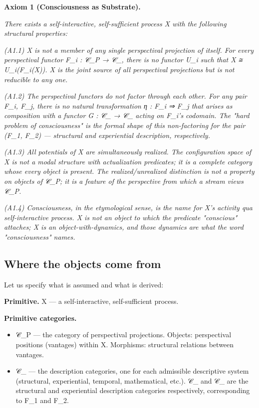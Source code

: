 \documentclass[11pt, openany]{book}
\begin{document}
\textbf{Axiom 1 (Consciousness as Substrate).}

\textit{There exists a self-interactive, self-sufficient process X with the following structural properties:}

\textit{(A1.1) X is not a member of any single perspectival projection of itself. For every perspectival functor F\_\allowbreak{}i : 𝒞\_\allowbreak{}P → 𝒞\_, there is no functor U\_\allowbreak{}i such that X ≅ U\_\allowbreak{}i(F\_\allowbreak{}i(X)). X is the joint source of all perspectival projections but is not reducible to any one.}

\textit{(A1.2) The perspectival functors do not factor through each other. For any pair F\_\allowbreak{}i, F\_\allowbreak{}j, there is no natural transformation η : F\_\allowbreak{}i ⇒ F\_\allowbreak{}j that arises as composition with a functor G : 𝒞\_ → 𝒞\_ acting on F\_\allowbreak{}i's codomain. The "hard problem of consciousness" is the formal shape of this non-factoring for the pair (F\_\allowbreak{}1, F\_\allowbreak{}2) --- structural and experiential description, respectively.}

\textit{(A1.3) All potentials of X are simultaneously realized. The configuration space of X is not a modal structure with actualization predicates; it is a complete category whose every object is present. The realized/unrealized distinction is not a property on objects of 𝒞\_\allowbreak{}P; it is a feature of the perspective from which a stream views 𝒞\_\allowbreak{}P.}

\textit{(A1.4) Consciousness, in the etymological sense, is the name for X's activity qua self-interactive process. X is not an object to which the predicate "conscious" attaches; X is an object-with-dynamics, and those dynamics are what the word "consciousness" names.}

\subsection{Where the objects come from}

Let us specify what is assumed and what is derived:

\textbf{Primitive.} X --- a self-interactive, self-sufficient process.

\textbf{Primitive categories.}
\begin{itemize}
\item 𝒞\_\allowbreak{}P --- the category of perspectival projections. Objects: perspectival positions (vantages) within X. Morphisms: structural relations between vantages.
\item 𝒞\_ --- the description categories, one for each admissible descriptive system (structural, experiential, temporal, mathematical, etc.). 𝒞\_ and 𝒞\_ are the structural and experiential description categories respectively, corresponding to F\_\allowbreak{}1 and F\_\allowbreak{}2.
\end{itemize}
\end{document}
